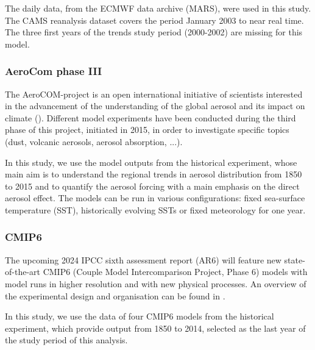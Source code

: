 \documentclass[journal abbreviation, manuscript]{copernicus}
\begin{document}
The daily data, from the ECMWF data archive (MARS), were used in this study. The CAMS reanalysis dataset covers the period January 2003 to near real time. The three first years of the trends study period (2000-2002) are missing for this model.

\subsubsection{AeroCom phase III}
The AeroCOM-project is an open international initiative of scientists interested in the advancement of the understanding of the global aerosol and its impact on climate (\cite{schulz2006radiative}). Different model experiments have been conducted during the third phase of this project, initiated in 2015, in order to investigate specific topics (dust, volcanic aerosols, aerosol absorption, ...). 

In this study, we use the model outputs from the historical experiment, whose main aim is to understand the regional trends in aerosol distribution from 1850 to 2015 and to quantify the aerosol forcing with a main emphasis on the direct aerosol effect. The models can be run in various configurations: fixed sea-surface temperature (SST), historically evolving SSTs or fixed meteorology for one year. 

\subsubsection{CMIP6}
The upcoming 2024 IPCC sixth assessment report (AR6) will feature new state-of-the-art CMIP6 (Couple Model Intercomparison Project, Phase 6) models with model runs in higher resolution and with new physical processes. An overview of the experimental design and organisation can be found in \cite{eyring2016overview}. 

In this study, we use the data of four CMIP6 models from the historical experiment, which provide output from 1850 to 2014, selected as the last year of the study period of this analysis.
\end{document}

